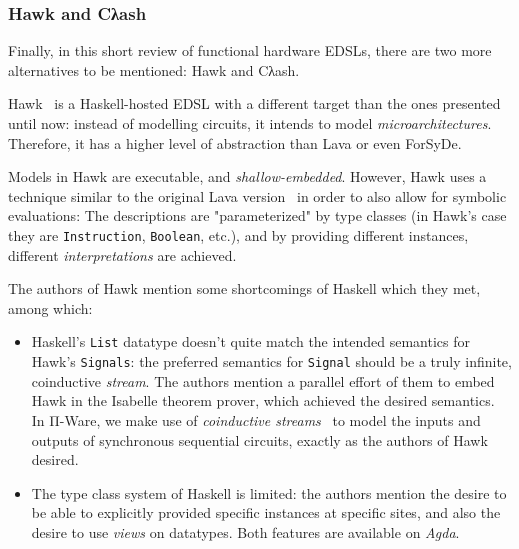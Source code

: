             \subsubsection{Hawk and Cλash}
            Finally, in this short review of functional hardware \acp{EDSL},
            there are two more alternatives to be mentioned: Hawk and Cλash.

            Hawk~\cite{hawk-haskell} is a Haskell-hosted \ac{EDSL} with a different target than
            the ones presented until now: instead of modelling circuits, it intends to model \emph{microarchitectures}.
            Therefore, it has a higher level of abstraction than Lava or even ForSyDe.

            Models in Hawk are executable, and \emph{shallow-embedded}.
            However, Hawk uses a technique similar to the original Lava version~\cite{lava-1999}
            in order to also allow for symbolic evaluations:
            The descriptions are "parameterized" by type classes
            (in Hawk's case they are \texttt{Instruction}, \texttt{Boolean}, etc.),
            and by providing different instances, different \emph{interpretations} are achieved.

            The authors of Hawk mention some shortcomings of Haskell which they met, among which:

            \begin{itemize}
                \item Haskell's \texttt{List} datatype doesn't quite match
                    the intended semantics for Hawk's \texttt{Signals}:
                    the preferred semantics for \texttt{Signal} should be a truly infinite, coinductive \emph{stream}.
                    The authors mention a parallel effort of them to embed Hawk in the Isabelle theorem prover,
                    which achieved the desired semantics.
                    In Π-Ware, we make use of \emph{coinductive streams}~\cite{introduction-coalgebra-jacobs}
                    to model the inputs and outputs of synchronous sequential circuits,
                    exactly as the authors of Hawk desired.
                \item The type class system of Haskell is limited: the authors mention the desire to be able
                    to explicitly provided specific instances at specific sites,
                    and also the desire to use \emph{views} on datatypes.
                    Both features are available on \emph{Agda}.
            \end{itemize}

